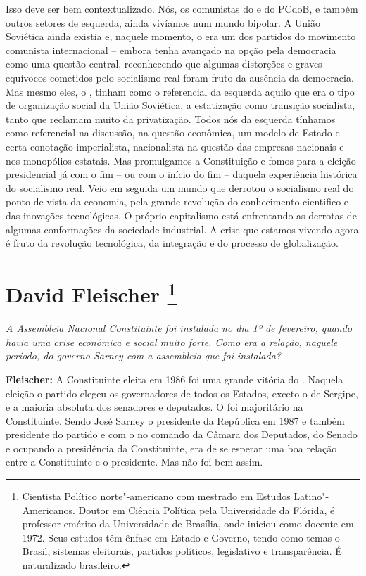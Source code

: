 Isso deve ser bem contextualizado. Nós, os comunistas
do  e do PCdoB, e também outros setores de esquerda, ainda vivíamos
num mundo bipolar. A União Soviética ainda existia e, naquele momento, o
 era um dos partidos do movimento comunista internacional -- embora
tenha avançado na opção pela democracia como uma questão central,
reconhecendo que algumas distorções e graves equívocos cometidos pelo
socialismo real foram fruto da ausência da democracia. Mas mesmo eles, o
, tinham como o referencial da esquerda aquilo que era o tipo de
organização social da União Soviética, a estatização como transição
socialista, tanto que reclamam muito da privatização. Todos nós da
esquerda tínhamos como referencial na discussão, na questão econômica,
um modelo de Estado e certa conotação imperialista, nacionalista na
questão das empresas nacionais e nos monopólios estatais. Mas
promulgamos a Constituição e fomos para a eleição presidencial já com o
fim -- ou com o início do fim -- daquela experiência histórica do
socialismo real. Veio em seguida um mundo que derrotou o socialismo real
do ponto de vista da economia, pela grande revolução do conhecimento
cientifico e das inovações tecnológicas. O próprio capitalismo está
enfrentando as derrotas de algumas conformações da sociedade industrial.
A crise que estamos vivendo agora é fruto da revolução tecnológica, da
integração e do processo de globalização.

\chapter{David Fleischer
\footnote{Cientista Político norte"-americano com mestrado em Estudos
Latino"-Americanos. Doutor em Ciência Política pela Universidade da
Flórida, é professor emérito da Universidade de Brasília, onde iniciou
como docente em 1972. Seus estudos têm ênfase em Estado e Governo, tendo
como temas o Brasil, sistemas eleitorais, partidos políticos,
legislativo e transparência. É naturalizado brasileiro.}}

\emph{A Assembleia Nacional Constituinte foi instalada no dia 1º de
fevereiro, quando havia uma crise econômica e social muito forte. Como
era a relação, naquele período, do governo Sarney com a assembleia que
foi instalada?}

\textbf{Fleischer:} A Constituinte eleita em 1986 foi uma grande vitória
do . Naquela eleição o partido elegeu os governadores de todos os
Estados, exceto o de Sergipe, e a maioria absoluta dos senadores e
deputados. O  foi majoritário na Constituinte. Sendo José Sarney o
presidente da República em 1987 e também presidente do partido e com o
 no comando da Câmara dos Deputados, do Senado e ocupando a
presidência da Constituinte, era de se esperar uma boa relação entre a
Constituinte e o presidente. Mas não foi bem assim.


